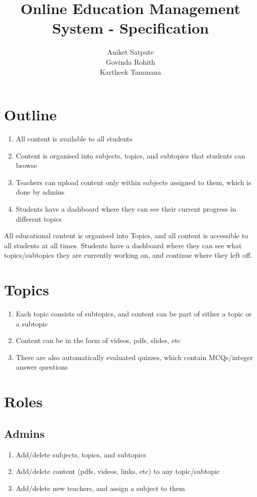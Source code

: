 \documentclass{article}
\title{Online Education Management System - Specification}
\author{Aniket Satpute \\ Govinda Rohith \\ Kartheek Tammana}
\begin{document}
\maketitle

\section{Outline}
\begin{enumerate}
    \item All content is available to all students
    \item Content is organised into subjects, topics, and subtopics that students can browse
    \item Teachers can upload content only within subjects assigned to them, which is done by
        admins
    \item Students have a dashboard where they can see their current progress in different topics
\end{enumerate}
All educational content is organised into Topics, and all content is accessible to all students at
all times. Students have a dashboard where they can see what topics/subtopics they are currently
working on, and continue where they left off.

\section{Topics}
\begin{enumerate}
    \item Each topic consists of subtopics, and content can be part of either a topic or a
        subtopic
    \item Content can be in the form of videos, pdfs, slides, etc
    \item There are also automatically evaluated quizzes, which contain MCQs/integer answer
        questions
\end{enumerate}

\section{Roles}

    \subsection{Admins}
    \begin{enumerate}
        \item Add/delete subjects, topics, and subtopics
        \item Add/delete content (pdfs, videos, links, etc) to any topic/subtopic
        \item Add/delete new teachers, and assign a subject to them
    \end{enumerate}
\end{document}
